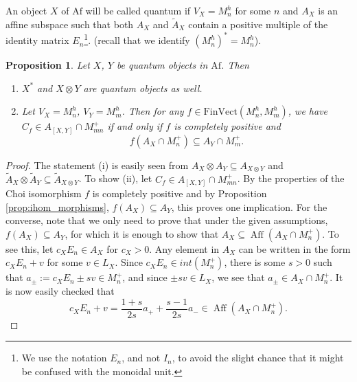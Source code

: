 \documentclass[12pt]{article}
\newtheorem{prop}{Proposition}
\theoremstyle{definition}
\theoremstyle{remark}
\def\aff{\operatorname{Aff}}
\def \Af{\mathrm{Af}}
\def \FV{\mathrm{FinVect}}
\begin{document}
An object $X$ of $\Af$ will be called quantum if $V_X=M_n^h$ for some $n$ and $A_X$ is an
affine subspace such that both $A_X$ and $\tilde A_X$ contain a positive multiple of the identity matrix
$E_n$\footnote{We use the notation $E_n$, and not $I_n$, to avoid the slight chance that
it might be confused with the monoidal unit.}.
(recall that we identify $(M_n^h)^*=M_n^h$). 




\begin{prop}\label{prop:ihom_quantum} Let $X$, $Y$ be quantum objects in $\Af$. Then 
\begin{enumerate}
\item[(i)] $X^*$ and $X\otimes Y$ are quantum objects as well. 
\item[(ii)] Let $V_X=M_n^h$, $V_Y=M_m^h$. Then for any $f\in \FV(M_n^h,M_m^h)$, we have
$C_f\in A_{[X,Y]}\cap M_{mn}^+$ if and only if $f$ is completely positive and
\[
f(A_X\cap M_n^+)\subseteq A_Y\cap M_m^+.
\]
\end{enumerate}


\end{prop}

\begin{proof} The statement (i) is easily seen from  $A_X\otimes A_Y
\subseteq  A_{X\otimes Y}$ and $\tilde A_X\otimes \tilde A_Y\subseteq \tilde A_{X\otimes
Y}$. %
To show (ii), let $C_f\in   A_{[X,Y]}\cap M_{mn}^+$. By the properties of the Choi
isomorphism $f$ is completely positive and by Proposition \ref{prop:ihom_morphisms},
$f(A_X)\subseteq A_Y$, this proves one implication. For the converse, note that we only
need to prove that under the given assumptions, $f(A_X)\subseteq A_Y$, for which it is enough
to show that $A_X\subseteq \aff(A_X\cap M_n^+)$. To see this, let  $c_XE_n\in  A_X$ for
$c_X>0$.  Any element in $A_X$ can be written in the form $c_XE_n+v$ for some $v\in L_X$.
Since $c_XE_n\in int(M_n^+)$, there is some $s>0$ such that $a_\pm:=c_XE_n\pm sv\in M_n^+$, and
since $\pm sv\in L_X$, we see that $a_\pm \in A_X\cap M_n^+$. It is now easily checked
that
\[
c_XE_n+v=\frac{1+s}{2s}a_++\frac{s-1}{2s}a_-\in \aff(A_X\cap M_n^+). 
\]


\end{proof}
\end{document}
